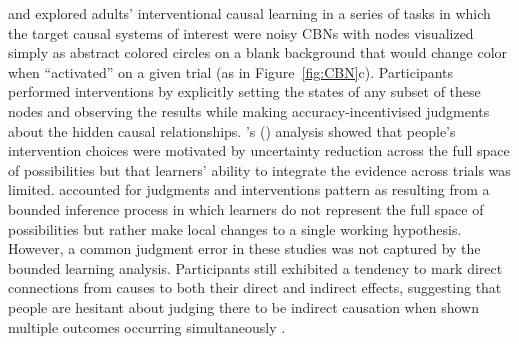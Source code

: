 \documentclass{cambridge7A}%
\def\citeapos#1{\citeauthor{#1}'s (\citeyear{#1})}
\begin{document}
\cite{bramley2015fcs} and \cite{bramley2017neurath} explored adults' interventional causal learning in a series of tasks in which the target causal systems of interest were noisy CBNs with nodes visualized simply as abstract colored circles on a blank background that would change color when ``activated'' on a given trial (as in Figure~\ref{fig:CBN}c).  Participants performed interventions by explicitly setting the states of any subset of these nodes and observing the results while making accuracy-incentivised judgments about the hidden causal relationships.  \citeapos{bramley2015fcs} analysis showed that people's intervention choices were motivated by uncertainty reduction across the full space of possibilities but that learners' ability to integrate the evidence across trials was limited.  %
\cite{bramley2017neurath} accounted for judgments and interventions pattern as resulting from a bounded inference process in which learners do not represent the full space of possibilities but rather make local changes to a single working hypothesis.  However, a common judgment error in these studies was not captured by the bounded learning analysis.  Participants still exhibited a tendency to mark direct connections from causes to both their direct and indirect effects, suggesting that people are hesitant about judging there to be indirect causation when shown multiple outcomes occurring simultaneously \citep[see also][]{mccormack2015temporal,fernbach2009causal}.%

\end{document}
